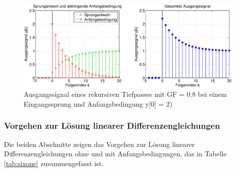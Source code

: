 \begin{figure}[H]
  \centerline{\includegraphics[width=1\textwidth]{Kapitel6/Bilder/image3.eps}}
  \caption{Ausgangssignal eines rekursiven Tiefpasses mit GF = 0.8 bei einem Eingangssprung und Anfangsbedingung y[0] = 2)}
  \label{fig:DifferenzengleichungMitAnfangsbedingungen}
\end{figure}
\clearpage
\subsubsection{Vorgehen zur L\"{o}sung linearer Differenzengleichungen}

\noindent Die beiden Abschnitte zeigen das Vorgehen zur L\"{o}sung linearer Differenzengleichungen ohne und mit Anfangsbedingungen, das in Tabelle \ref{tab:sixone} zusammengefasst ist.

